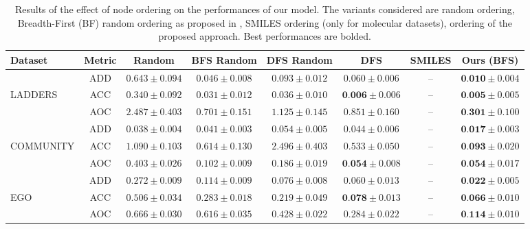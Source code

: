 \begin{table}
    \centering
    \caption{Results of the effect of node ordering on the performances of our model. The variants considered are random ordering, Breadth-First (BF) random ordering as proposed in \cite{you2018graphrnn}, SMILES ordering (only for molecular datasets), ordering of the proposed approach. Best performances are bolded.}
    \label{tab:graph-ordering-qualitative}
    \renewcommand{\arraystretch}{1.2}
    \begin{tabular}{lccccccc}
        \toprule
         \textbf{Dataset} & \textbf{Metric} & \textbf{Random} & \textbf{BFS Random} & \textbf{DFS Random} & \textbf{DFS} & \textbf{SMILES} & \textbf{Ours (BFS)}\\
         \midrule
          & ADD           & $0.643 \pm 0.094$ & $0.046 \pm 0.008$ & $0.093 \pm 0.012$ & $0.060 \pm 0.006$ & --                           & $\textbf{0.010} \pm 0.004$\\
          LADDERS & ACC   & $0.340 \pm 0.092$ & $0.031 \pm 0.012$ & $0.036 \pm 0.010$ & $\textbf{0.006} \pm 0.006$ & --                           & $\textbf{0.005} \pm 0.005$\\
          & AOC           & $2.487 \pm 0.403$ & $0.701 \pm 0.151$ & $1.125 \pm 0.145$ & $0.851 \pm 0.160$ & --                           & $\textbf{0.301} \pm 0.100$\\
         \midrule
          & ADD           & $0.038 \pm 0.004$ & $0.041 \pm 0.003$ & $0.054 \pm 0.005$ & $0.044 \pm 0.006$ & --                           & $\textbf{0.017} \pm 0.003$\\
          COMMUNITY & ACC & $1.090 \pm 0.103$ & $0.614 \pm 0.130$ & $2.496 \pm 0.403$ & $0.533 \pm 0.050$ & --                           & $\textbf{0.093} \pm 0.020$\\
          & AOC           & $0.403 \pm 0.026$ & $0.102 \pm 0.009$ & $0.186 \pm 0.019$ & $\textbf{0.054} \pm 0.008$ & --                           & $\textbf{0.054} \pm 0.017$\\
          \midrule
          & ADD           & $0.272 \pm 0.009$ & $0.114 \pm 0.009$ & $0.076 \pm 0.008$ & $0.060 \pm 0.013$ & --                           & $\textbf{0.022} \pm 0.005$\\
          EGO & ACC       & $0.506 \pm 0.034$ & $0.283 \pm 0.018$ & $0.219 \pm 0.049$ & $\textbf{0.078} \pm 0.013$ & --                           & $\textbf{0.066} \pm 0.010$\\
          & AOC           & $0.666 \pm 0.030$ & $0.616 \pm 0.035$ & $0.428 \pm 0.022$ & $0.284 \pm 0.022$ & --                           & $\textbf{0.114} \pm 0.010$\\

\end{tabular}
\end{table}
